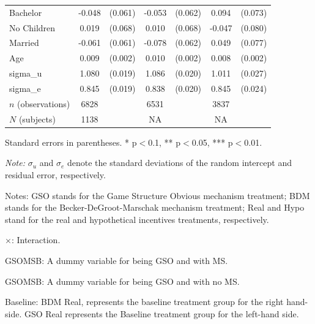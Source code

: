 \documentclass[12pt]{article}
\newcommand{\sym}[1]{\rlap{$^{#1}$}}
\begin{document}
\begin{table}[H]
{\begin{tabular}{l*{3}{cc}}
Bachelor    &      -0.048         &     (0.061)&      -0.053         &     (0.062)&       0.094         &     (0.073)\\
No Children &       0.019         &     (0.068)&       0.010         &     (0.068)&      -0.047         &     (0.080)\\
Married     &      -0.061         &     (0.061)&      -0.078         &     (0.062)&       0.049         &     (0.077)\\
Age         &       0.009\sym{***}&     (0.002)&       0.010\sym{***}&     (0.002)&       0.008\sym{***}&     (0.002)\\
sigma\_u     &       1.080\sym{***}&     (0.019)&       1.086\sym{***}&     (0.020)&       1.011\sym{***}&     (0.027)\\
sigma\_e     &       0.845\sym{***}&     (0.019)&       0.838\sym{***}&     (0.020)&       0.845\sym{***}&     (0.024)\\

\hline
\(n\) (observations)      &        6828         &            &        6531         &            &        3837         &            \\

\(N\) (subjects)       &        1138         &            &       NA         &            &        NA       &            \\
\hline\hline
\end{tabular}
}


\begin{tablenotes}
            \footnotesize
            \item Standard errors in parentheses. * p$<$0.1, ** p$<$0.05, *** p$<$0.01.
            \item \textit{Note:} $\sigma_u$ and $\sigma_e$ denote the standard deviations of the random intercept and residual error, respectively.
            \item Notes: GSO stands for the Game Structure Obvious mechanism treatment; BDM stands for the Becker-DeGroot-Marschak mechanism treatment; Real and Hypo stand for the real and hypothetical incentives treatments, respectively.
           \item $\times$: Interaction.
           \item GSOMSB: A dummy variable for being GSO and with MS.
           \item GSOMSB: A dummy variable for being GSO and with no MS.
           \item Baseline: BDM Real, represents the baseline treatment group for the right hand-side.
           GSO Real represents the Baseline treatment group for the left-hand side.
        \end{tablenotes}

\end{table}
\end{document}
